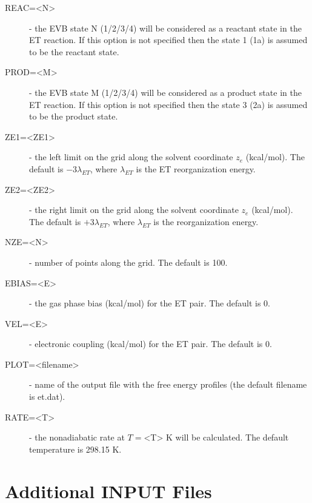 \documentclass[oneside,11pt,openany]{book}
\newcommand{\tw}{\ttfamily}
\begin{document}
\begin{description}

\item[{\tw REAC=<N>}] - the EVB state {\tw N} (1/2/3/4) will be considered
           as a reactant state in the ET reaction. If this
           option is not specified then the state 1 (1a)
           is assumed to be the reactant state.

\item[{\tw PROD=<M>}] - the EVB state {\tw M} (1/2/3/4) will be considered
           as a product state in the ET reaction. If this
           option is not specified then the state 3 (2a)
           is assumed to be the product state.

\item[{\tw ZE1=<ZE1>}] - the left limit on the grid along the solvent
            coordinate $z_e$ (kcal/mol). The default is
            $-3\lambda_{ET}$, where $\lambda_{ET}$ is the
            ET reorganization energy.

\item[{\tw ZE2=<ZE2>}] - the right limit on the grid along the solvent
            coordinate $z_e$ (kcal/mol). The default is
            $+3\lambda_{ET}$, where $\lambda_{ET}$ is the
            reorganization energy.

\item[{\tw NZE=<N>}] - number of points along the grid. The default is 100.

\item[{\tw EBIAS=<E>}] - the gas phase bias (kcal/mol) for the ET pair. The default is 0.

\item[{\tw VEL=<E>}] - electronic coupling (kcal/mol) for the ET pair. The default is 0.

\item[{\tw PLOT=<filename>}] - name of the output file with the free energy
                  profiles (the default filename is {\tw et.dat}).

\item[{\tw RATE=<T>}] - the nonadiabatic rate at $T=${\tw <T>} K
                        will be calculated. The default temperature
                        is 298.15 K.

\end{description}


\section{Additional INPUT Files}
%
\end{document}
